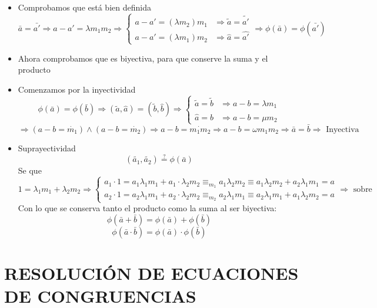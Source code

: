 \documentclass[10pt,a4paper,openright]{book}
\begin{document}
\begin{itemize}
\item Comprobamos que está bien definida
$$\bar{a}=\bar{a'}\Rightarrow a-a'=\lambda m_1m_2\Rightarrow
\begin{cases}
a-a'=(\lambda m_2)m_1 & \Rightarrow \tilde{a}=\tilde{a'} \\
a-a'=(\lambda m_1)m_2 & \Rightarrow \hat{a}=\hat{a'}
\end{cases}
\Rightarrow \phi(\bar{a})=\phi(\bar{a'})
$$

\item Ahora comprobamos que es biyectiva, para que conserve la suma y el producto
\item Comenzamos por la inyectividad
$$\phi(\bar{a})=\phi(\bar{b})\Rightarrow (\tilde{a}, \hat{a})=(\tilde{b}, \hat{b})\Rightarrow
\begin{cases}
\tilde{a}=\tilde{b} & \Rightarrow a-b=\lambda m_1 \\
\hat{a}=\hat{b} & \Rightarrow a-b=\mu m_2
\end{cases}
$$
$$
\Rightarrow (a-b=\dot{m_1})\wedge (a-b=\dot{m_2})\Rightarrow a-b=\dot{m_1m_2} \Rightarrow a-b=\omega m_1 m_2 \Rightarrow \bar{a}=\bar{b}\Rightarrow \mbox{ Inyectiva}
$$
\item Suprayectividad
$$(\tilde{a_1},\tilde{a_2})\stackrel{?}{=}\phi(\bar{a})$$
Se que $$1=\lambda_1 m_1+\lambda_2 m_2 \Rightarrow
\begin{cases}
a_1\cdot 1=a_1\lambda_1 m_1+ a_1\cdot \lambda_2 m_2\equiv_{m_1} a_1\lambda_2 m_2\equiv a_1\lambda_2 m_2+a_2\lambda_1 m_1= a\\
a_2\cdot 1=a_2\lambda_1 m_1+ a_2\cdot \lambda_2 m_2\equiv_{m_2} a_2\lambda_1 m_1\equiv a_2\lambda_1 m_1+ a_1\lambda_2 m_2= a 
\end{cases}
\Rightarrow \mbox{ sobre}
$$
Con lo que se conserva tanto el producto como la suma al ser biyectiva:
$$\phi(\bar{a}+\bar{b})=\phi(\bar{a})+\phi(\bar{b})$$
$$\phi(\bar{a}\cdot \bar{b})=\phi(\bar{a})\cdot \phi(\bar{b})$$
\end{itemize}


\section*{RESOLUCIÓN DE ECUACIONES DE CONGRUENCIAS}
\end{document}
